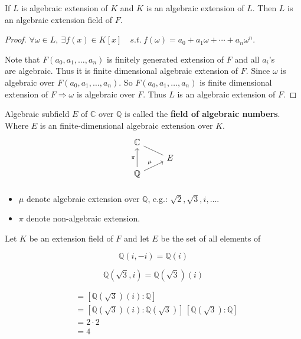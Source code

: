 \begin{corollary}
    If $L$ is algebraic extension of $K$ and $K$ is an algebraic extension of $L$. Then 
    $L$ is an algebraic extension field of $F$.
\end{corollary}
\begin{proof}
    $\forall \omega \in L, \> \exists f(x) \in K[x] \quad s.t. \> f(\omega) = a_0 + a_1 \omega 
    + \cdots + a_n \omega^n$. 

    Note that $F(a_0, a_1, \ldots, a_n)$ is finitely generated extension of $F$ and all $a_i$'s
    \\are algebraic. Thus it is finite dimensional algebraic extension of $F$. Since 
    $\omega$ is algebraic over $F(a_0, a_1, \ldots, a_n)$. So $F(a_0, a_1, \ldots, a_n)$ is finite 
    dimensional extension of $F \Longrightarrow \omega$ is algebraic over $F$.
    Thus $L$ is an algebraic extension of $F$.
\end{proof}

\begin{remark}
    Algebraic subfield $E$ of $\mathbb{C}$ over $\mathbb{Q}$ is called the \textbf{field of algebraic numbers}. 
    Where $E$ is an finite-dimensional algebraic extension over $K$.
    \[
        \begin{tikzcd}[row sep=tiny]
            \mathbb{C} &\\
             & E  \arrow[dash]{ul}
            \\
            \mathbb{Q} \arrow[uu, "\pi"] \arrow[ur, "\mu"]&\\
        \end{tikzcd}
    \]

    \begin{itemize}
        \item $\mu$ denote algebraic extension over $\mathbb{Q}$, e.g.: $\sqrt{2}, \sqrt{3}, i, \ldots$.
        \item $\pi$ denote non-algebraic extension.
    \end{itemize}
\end{remark}

\begin{corollary}
    Let $K$ be an extension field of $F$ and let $E$ be the set of all elements of 
\end{corollary}


\begin{example}
    \[
        \mathbb{Q}(i, -i) = \mathbb{Q}(i)
    \]
\end{example}

\begin{example}
    $$\mathbb{Q}(\sqrt{3}, i) = \mathbb{Q}(\sqrt{3})(i)$$
\end{example}
\begin{solution}
    \begin{align*}
        [\mathbb{Q}(\sqrt{3}, i)] &= [\mathbb{Q}(\sqrt{3})(i): \mathbb{Q}]\\
        &= [\mathbb{Q}(\sqrt{3})(i): \mathbb{Q}(\sqrt{3})]\, [\mathbb{Q}(\sqrt{3}): \mathbb{Q}]\\
        &= 2 \cdot 2\\
        &= 4
    \end{align*}
\end{solution}

